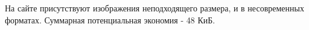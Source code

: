 \noindent
\begin{minipage}{\linewidth}
\end{minipage}
\bigskip

\noindent
\begin{minipage}{\linewidth}
\end{minipage}
\bigskip

На сайте присутствуют изображения неподходящего размера, и в несовременных форматах. Суммарная потенциальная экономия - 48 КиБ.

